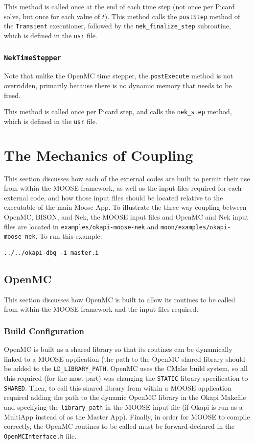 \documentclass[10pt]{article}
\newcounter{subsubsubsection}[subsubsection]
\numberwithin{equation}{section} %
\begin{document}
This method is called once at the end of each time step (not once per Picard solve, but once for each value of \(t\)). This method calls the {\tt postStep} method of the {\tt Transient} executioner, followed by the {\tt nek\_finalize\_step} subroutine, which is defined in the {\tt usr} file.

\subsubsection{{\tt NekTimeStepper}}
Note that unlike the OpenMC time stepper, the {\tt postExecute} method is not overridden, primarily because there is no dynamic memory that needs to be freed.

This method is called once per Picard step, and calls the {\tt nek\_step} method, which is defined in the {\tt usr} file.

\clearpage
\section{The Mechanics of Coupling}
This section discusses how each of the external codes are built to permit their use from within the MOOSE framework, as well as the input files required for each external code, and how those input files should be located relative to the executable of the main Moose App. To illustrate the three-way coupling between OpenMC, BISON, and Nek, the MOOSE input files and OpenMC and Nek input files are located in {\tt examples/okapi-moose-nek} and {\tt moon/examples/okapi-moose-nek}. To run this example:

\begin{lstlisting}
../../okapi-dbg -i master.i
\end{lstlisting}

\subsection{OpenMC}
This section discusses how OpenMC is built to allow its routines to be called from within the MOOSE framework and the input files required.

\subsubsection{Build Configuration}
OpenMC is built as a shared library so that its routines can be dynamically linked to a MOOSE application (the path to the OpenMC shared library should be added to the {\tt LD\_LIBRARY\_PATH}. OpenMC uses the CMake build system, so all this required (for the most part) was changing the {\tt STATIC} library specification to {\tt SHARED}. Then, to call this shared library from within a MOOSE application required adding the path to the dynamic OpenMC library in the Okapi Makefile and specifying the {\tt library\_path} in the MOOSE input file (if Okapi is run as a MultiApp instead of as the Master App). Finally, in order for MOOSE to compile correctly, the OpenMC routines to be called must be forward-declared in the {\tt OpenMCInterface.h} file.
\end{document}
